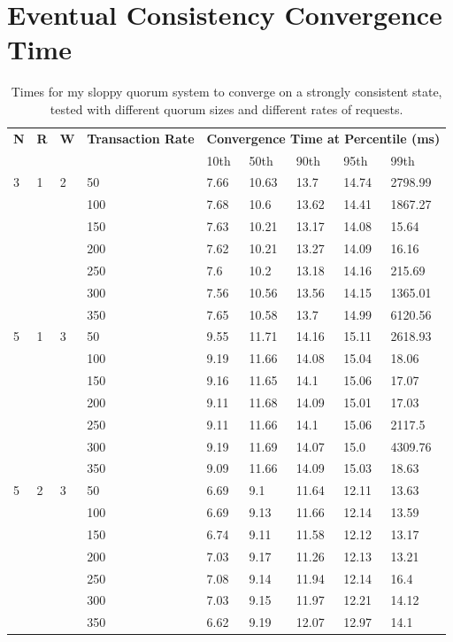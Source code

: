 \documentclass[12pt,a4paper,twoside,openany]{report}
\begin{document}
\newpage

\section{Eventual Consistency Convergence Time} \label{convs}

\begin{table}[h!]
\centering
\renewcommand{\arraystretch}{1.3}
\begin{tabular}{@{} l l l l l l l l l @{}}
\toprule
\bf N & \bf R & \bf W & \bf Transaction Rate & \multicolumn{5}{c}{\bf Convergence Time at Percentile (ms)} \\
& & & & 10th & 50th & 90th & 95th & 99th \\
\hline
3 & 1 & 2 & 50 & 7.66 & 10.63 & 13.7 & 14.74 & 2798.99 \\
& & & 100 & 7.68 & 10.6 & 13.62 & 14.41 & 1867.27 \\
& & & 150 & 7.63 & 10.21 & 13.17 & 14.08 & 15.64 \\
& & & 200 & 7.62 & 10.21 & 13.27 & 14.09 & 16.16 \\
& & & 250 & 7.6 & 10.2 & 13.18 & 14.16 & 215.69 \\
& & & 300 & 7.56 & 10.56 & 13.56 & 14.15 & 1365.01 \\
& & & 350 & 7.65 & 10.58 & 13.7 & 14.99 & 6120.56 \\
\hline
5 & 1 & 3 & 50 & 9.55 & 11.71 & 14.16 & 15.11 & 2618.93 \\
& & & 100 & 9.19 & 11.66 & 14.08 & 15.04 & 18.06 \\
& & & 150 & 9.16 & 11.65 & 14.1 & 15.06 & 17.07 \\
& & & 200 & 9.11 & 11.68 & 14.09 & 15.01 & 17.03 \\
& & & 250 & 9.11 & 11.66 & 14.1 & 15.06 & 2117.5 \\
& & & 300 & 9.19 & 11.69 & 14.07 & 15.0 & 4309.76 \\
& & & 350 & 9.09 & 11.66 & 14.09 & 15.03 & 18.63 \\
\hline
5 & 2 & 3 & 50 & 6.69 & 9.1 & 11.64 & 12.11 & 13.63 \\
& & & 100 & 6.69 & 9.13 & 11.66 & 12.14 & 13.59 \\
& & & 150 & 6.74 & 9.11 & 11.58 & 12.12 & 13.17 \\
& & & 200 & 7.03 & 9.17 & 11.26 & 12.13 & 13.21 \\
& & & 250 & 7.08 & 9.14 & 11.94 & 12.14 & 16.4 \\
& & & 300 & 7.03 & 9.15 & 11.97 & 12.21 & 14.12 \\
& & & 350 & 6.62 & 9.19 & 12.07 & 12.97 & 14.1 \\
\bottomrule
\end{tabular}
\caption{Times for my sloppy quorum system to converge on a strongly consistent state, tested with different quorum sizes and different rates of requests.}
\label{convergencetimes}
\end{table}
\end{document}
